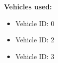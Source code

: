 \documentclass{article}
\begin{document}
\textbf{Vehicles used:}
\begin{itemize}
  \item Vehicle ID: 0
  \item Vehicle ID: 2
  \item Vehicle ID: 3
\end{itemize}
\end{document}
